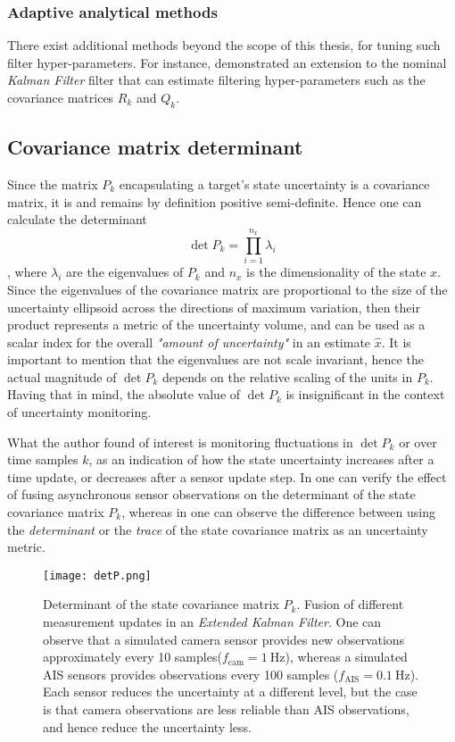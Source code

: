 \subsubsection{Adaptive analytical methods}
There exist additional methods beyond the scope of this thesis, for tuning such filter hyper-parameters. For instance, \cite{Zhou1989,Ljung1979,} demonstrated an extension to the nominal  \emph{Kalman Filter} filter that can estimate filtering hyper-parameters such as the covariance matrices $R_k$ and $Q_k$. 
\subsection{Covariance matrix determinant}\label{ssec:CovMatDet}


Since the matrix $P_k$ encapsulating a target's state uncertainty is a covariance matrix, it is and remains by definition positive semi-definite. Hence one can calculate the determinant $$\det{P_k} = \prod_{i=1}^{n_x} \lambda_i$$ , where $\lambda_i$ are the eigenvalues of $P_k$ and $n_x$ is the dimensionality of the state $x$. Since the eigenvalues of the covariance matrix are proportional to the size of the uncertainty ellipsoid across the directions of maximum variation, then their product represents a metric of the uncertainty volume, and can be used as a scalar index for the overall \textit{"amount of uncertainty"} in an estimate $\hat{x}$. It is important to mention that the eigenvalues are not scale invariant, hence the actual magnitude of $\det{P_k}$ depends on the relative scaling of the units in $P_k$. Having that in mind, the absolute value of $\det{P_k}$ is insignificant in the context of uncertainty monitoring. 

What the author found of interest is monitoring fluctuations in $\det{P_k}$ or over time samples $k$, as an indication of how the state uncertainty increases after a time update, or decreases after a sensor update step. In  one can verify the effect of fusing asynchronous sensor observations on the determinant of the state covariance matrix $P_k$, whereas in  one can observe the difference between using the \emph{determinant} or the \emph{trace} of the state covariance matrix as an uncertainty metric.



\begin{figure}[H]
	\centering
	\texttt{[image: detP.png]}
	\caption{Determinant of the state covariance matrix $P_k$. Fusion of different measurement updates in an \emph{Extended Kalman Filter}. One can observe that a simulated camera sensor provides new observations approximately every 10 samples($f_{\text{cam}} = \SI{1}{\Hz}$), whereas a simulated AIS sensors provides observations every 100 samples ($f_{\text{AIS}} = \SI{0.1}{\Hz}$). Each sensor reduces the uncertainty at a different level, but the case is that camera observations are less reliable than AIS observations, and hence reduce the uncertainty less.}
	\label{fig:detp}
\end{figure}

